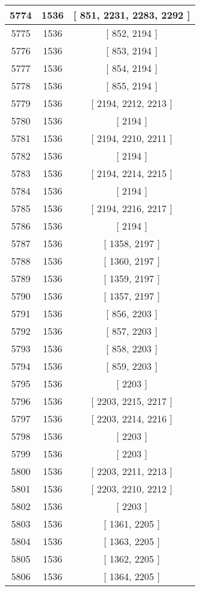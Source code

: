 \begin{center}
\begin{longtable}[H]{|| c c c ||}
\hline
5774 & 1536 & [ 851, 2231, 2283, 2292 ] \\ 
\hline
5775 & 1536 & [ 852, 2194 ] \\ 
\hline
5776 & 1536 & [ 853, 2194 ] \\ 
\hline
5777 & 1536 & [ 854, 2194 ] \\ 
\hline
5778 & 1536 & [ 855, 2194 ] \\ 
\hline
5779 & 1536 & [ 2194, 2212, 2213 ] \\ 
\hline
5780 & 1536 & [ 2194 ] \\ 
\hline
5781 & 1536 & [ 2194, 2210, 2211 ] \\ 
\hline
5782 & 1536 & [ 2194 ] \\ 
\hline
5783 & 1536 & [ 2194, 2214, 2215 ] \\ 
\hline
5784 & 1536 & [ 2194 ] \\ 
\hline
5785 & 1536 & [ 2194, 2216, 2217 ] \\ 
\hline
5786 & 1536 & [ 2194 ] \\ 
\hline
5787 & 1536 & [ 1358, 2197 ] \\ 
\hline
5788 & 1536 & [ 1360, 2197 ] \\ 
\hline
5789 & 1536 & [ 1359, 2197 ] \\ 
\hline
5790 & 1536 & [ 1357, 2197 ] \\ 
\hline
5791 & 1536 & [ 856, 2203 ] \\ 
\hline
5792 & 1536 & [ 857, 2203 ] \\ 
\hline
5793 & 1536 & [ 858, 2203 ] \\ 
\hline
5794 & 1536 & [ 859, 2203 ] \\ 
\hline
5795 & 1536 & [ 2203 ] \\ 
\hline
5796 & 1536 & [ 2203, 2215, 2217 ] \\ 
\hline
5797 & 1536 & [ 2203, 2214, 2216 ] \\ 
\hline
5798 & 1536 & [ 2203 ] \\ 
\hline
5799 & 1536 & [ 2203 ] \\ 
\hline
5800 & 1536 & [ 2203, 2211, 2213 ] \\ 
\hline
5801 & 1536 & [ 2203, 2210, 2212 ] \\ 
\hline
5802 & 1536 & [ 2203 ] \\ 
\hline
5803 & 1536 & [ 1361, 2205 ] \\ 
\hline
5804 & 1536 & [ 1363, 2205 ] \\ 
\hline
5805 & 1536 & [ 1362, 2205 ] \\ 
\hline
5806 & 1536 & [ 1364, 2205 ] \\ 

\end{longtable}
\end{center}
